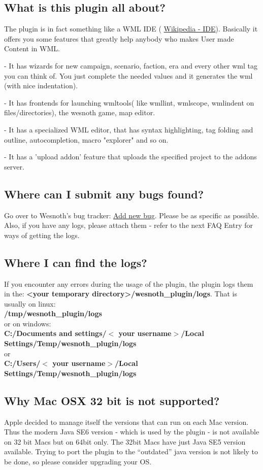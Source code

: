 \documentclass[10pt]{article}
\begin{document}
\subsection{What is this plugin all about?}
The plugin is in fact something like a WML IDE ( \href{http://en.wikipedia.org/wiki/Integrated_development_environment}{Wikipedia - IDE}). Basically it offers you some features that greatly help anybody who makes User made Content in WML.
\begin{description}
\item- It has wizards for new campaign, scenario, faction, era and every other wml tag you can think of. You just complete the needed values and it generates the wml (with nice indentation).
\item- It has frontends for launching wmltools( like wmllint, wmlscope, wmlindent on files/directories), the wesnoth game, map editor.
\item- It has a specialized WML editor, that has syntax highlighting, tag folding and outline, autocompletion, macro "explorer" and so on.
\item- It has a 'upload addon' feature that uploads the specified project to the addons server.
\end{description}

\subsection{Where can I submit any bugs found?}
Go over to Wesnoth's bug tracker: \href{https://gna.org/bugs/?func=additem&group=wesnoth&bug_group_id=116}{Add new bug}. Please be as specific as possible. Also, if you have any logs, please attach them - refer to the next FAQ Entry for ways of getting the logs.

\subsection{Where I can find the logs?}
If you encounter any errors during the usage of the plugin, the plugin logs them in the: \textbf{\textless your temporary directory\textgreater /wesnoth\_plugin/logs}.
That is usually on linux:\\
\indent \textbf{/tmp/wesnoth\_plugin/logs}\\
or on windows:\\
\indent \textbf{C:/Documents and settings/$<$ your username$>$/Local Settings/Temp/wesnoth\_plugin/logs} \\
or\\
\indent \textbf{C:/Users/$<$ your username$>$/Local Settings/Temp/wesnoth\_plugin/logs}

\subsection{Why Mac OSX 32 bit is not supported?}
Apple decided to manage itself the versions that can run on each Mac version. Thus the modern Java SE6 version - which is used by the plugin - is not available on 32 bit Macs but on 64bit only. The 32bit Macs have just Java SE5 version available. Trying to port the plugin to the ``outdated'' java version is not likely to be done, so please consider upgrading your OS.
\end{document}
